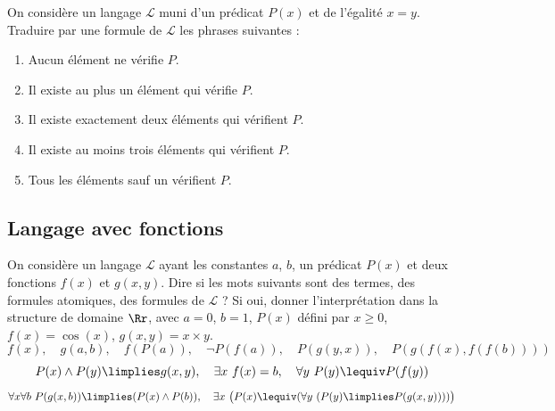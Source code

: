 \documentclass[11pt,class=report,crop=false]{standalone}
\begin{document}
\begin{exercicecours}
On considère un langage $\mathcal{L}$ muni d'un prédicat $P(x)$ et de l'égalité $x=y$.
Traduire par une formule de $\mathcal{L}$ les phrases suivantes :
\begin{enumerate}
	\item Aucun élément ne vérifie $P$.
	
	\item Il existe au plus un élément qui vérifie $P$.
	
	\item Il existe exactement deux éléments qui vérifient $P$.
	
	\item Il existe au moins trois éléments qui vérifient $P$.
	
	\item Tous les éléments sauf un vérifient $P$.
\end{enumerate}	
\end{exercicecours}



\subsection*{Langage avec fonctions}


\begin{exercicecours}
On considère un langage $\mathcal{L}$ ayant les constantes $a$, $b$, un prédicat 
$P(x)$ et deux fonctions $f(x)$ et $g(x,y)$.
 Dire si les mots suivants sont des termes, des formules atomiques, des formules de $\mathcal{L}$ ?
Si oui, donner l'interprétation dans la structure de domaine $\Rr$, avec $a=0$, $b=1$, $P(x)$ défini par $x \ge 0$, $f(x) = \cos(x)$, $g(x,y) = x \times y$.
\[
f(x), \quad g(a,b), \quad f(P(a)), \quad \lnot P(f(a)), \quad P(g(y,x)), \quad
P(g(f(x),f(f(b))))
\]
\[
P(x) \land P(y) \limplies g(x,y), \quad
\exists x \ f(x) = b, \quad
\forall y \ P(y) \lequiv P(f(y))
\]
\[
\forall x \forall b \ P(g(x,b)) \limplies (P(x) \land P(b)),\quad
\exists x \ \big( P(x) \lequiv (\forall y \ (P(y) \limplies P(g(x,y)))) \big)
\] 

\end{exercicecours}
\end{document}
